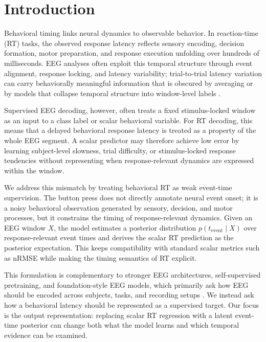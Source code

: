 \documentclass[12pt]{article}
\begin{document}
\section{Introduction}

Behavioral timing links neural dynamics to observable behavior. In reaction-time (RT) tasks, the observed response latency reflects sensory encoding, decision formation, motor preparation, and response execution unfolding over hundreds of milliseconds. EEG analyses often exploit this temporal structure through event alignment, response locking, and latency variability; trial-to-trial latency variation can carry behaviorally meaningful information that is obscured by averaging or by models that collapse temporal structure into window-level labels \citep{Jung1998SingleTrialERP,Ouyang2017LatencyReview}.

Supervised EEG decoding, however, often treats a fixed stimulus-locked window as an input to a class label or scalar behavioral variable. For RT decoding, this means that a delayed behavioral response latency is treated as a property of the whole EEG segment. A scalar predictor may therefore achieve low error by learning subject-level slowness, trial difficulty, or stimulus-locked response tendencies without representing when response-relevant dynamics are expressed within the window.

We address this mismatch by treating behavioral RT as weak event-time supervision. The button press does not directly annotate neural event onset; it is a noisy behavioral observation generated by sensory, decision, and motor processes, but it constrains the timing of response-relevant dynamics. Given an EEG window \(X\), the model estimates a posterior distribution \(p(t_{\mathrm{event}}\mid X)\) over response-relevant event times and derives the scalar RT prediction as the posterior expectation. This keeps compatibility with standard scalar metrics such as nRMSE while making the timing semantics of RT explicit.

This formulation is complementary to stronger EEG architectures, self-supervised pretraining, and foundation-style EEG models, which primarily ask how EEG should be encoded across subjects, tasks, and recording setups \citep{wang2024eegpt,Jiang2024LaBraM,Chen2024EEGFormer,Wang2025EEGMamba,ElOuahidi2025REVE,Yue2024BrainGPT}. We instead ask how a behavioral latency should be represented as a supervised target. Our focus is the output representation: replacing scalar RT regression with a latent event-time posterior can change both what the model learns and which temporal evidence can be examined.
\end{document}
